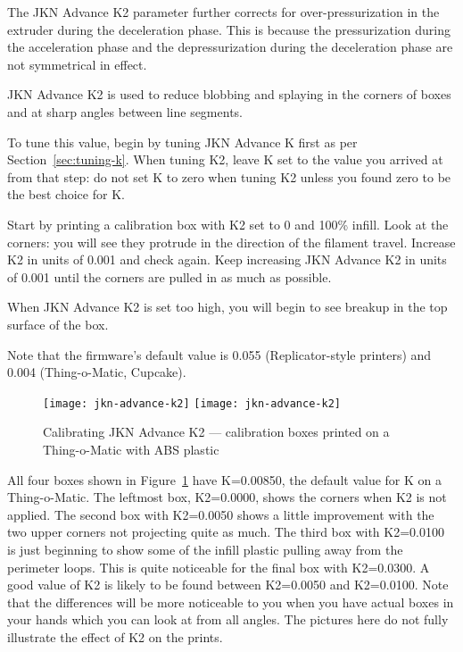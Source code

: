 The JKN Advance K2 parameter further corrects for o\-ver-pres\-sur\-i\-za\-tion
in the extruder during the deceleration phase. This is because the
pressurization during the acceleration phase and the depressurization
during the deceleration phase are not symmetrical in effect.

JKN Advance K2 is used to reduce blobbing and splaying in the corners
of boxes and at sharp angles between line segments.

To tune this value, begin by tuning JKN Advance K first as per
Section~\ref{sec:tuning-k}.  When tuning K2, leave K set to the value you
arrived at from that step: do not set K to zero when tuning K2 unless
you found zero to be the best choice for K.

Start by printing a calibration box with K2 set to 0 and 100\%
infill.  Look at the corners: you will see they protrude in the
direction of the filament travel. Increase K2 in units of 0.001 and
check again. Keep increasing JKN Advance K2 in units of 0.001 until
the corners are pulled in as much as possible.

When JKN Advance K2 is set too high, you will begin to see breakup in the top
surface of the box.

Note that the firmware's default value is 0.055 (Replicator-style
printers) and 0.004 (Thing-o-Matic, Cupcake).

\begin{figure}[!htbp]
  \centering
    \ifpdf
      \texttt{[image: jkn-advance-k2]}
    \else
      \texttt{[image: jkn-advance-k2]}
    \fi
    \caption{Calibrating JKN Advance K2 --- calibration boxes printed on a Thing-o-Matic with ABS plastic}
  \label{fig:jkn-advance-k2}
\end{figure}

All four boxes shown in Figure~\ref{fig:jkn-advance-k2} have
K=0.00850, the default value for K on a Thing-o-Matic. The
leftmost box, K2=0.0000, shows the corners when K2 is not
applied. The second box with K2=0.0050 shows a little improvement
with the two upper corners not projecting quite as much. The third
box with K2=0.0100 is just beginning to show some of the infill
plastic pulling away from the perimeter loops. This is quite
noticeable for the final box with K2=0.0300. A good value of K2 is
likely to be found between K2=0.0050 and K2=0.0100. Note that the
differences will be more noticeable to you when you have actual boxes
in your hands which you can look at from all angles. The pictures here
do not fully illustrate the effect of K2 on the prints.
